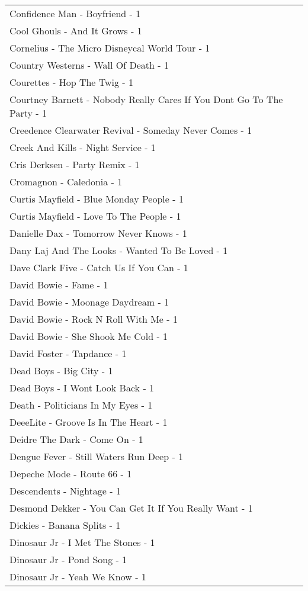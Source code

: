 \documentclass[
]{article}
\begin{document}
\begin{longtable}{l}
Confidence Man - Boyfriend - 1 \\ 
Cool Ghouls - And It Grows - 1 \\ 
Cornelius - The Micro Disneycal World Tour - 1 \\ 
Country Westerns - Wall Of Death - 1 \\ 
Courettes - Hop The Twig - 1 \\ 
Courtney Barnett - Nobody Really Cares If You Dont Go To The Party - 1 \\ 
Creedence Clearwater Revival - Someday Never Comes - 1 \\ 
Creek And Kills - Night Service - 1 \\ 
Cris Derksen - Party Remix - 1 \\ 
Cromagnon - Caledonia - 1 \\ 
Curtis Mayfield - Blue Monday People - 1 \\ 
Curtis Mayfield - Love To The People - 1 \\ 
Danielle Dax - Tomorrow Never Knows - 1 \\ 
Dany Laj And The Looks - Wanted To Be Loved - 1 \\ 
Dave Clark Five - Catch Us If You Can - 1 \\ 
David Bowie - Fame - 1 \\ 
David Bowie - Moonage Daydream - 1 \\ 
David Bowie - Rock N Roll With Me - 1 \\ 
David Bowie - She Shook Me Cold - 1 \\ 
David Foster - Tapdance - 1 \\ 
Dead Boys - Big City - 1 \\ 
Dead Boys - I Wont Look Back - 1 \\ 
Death - Politicians In My Eyes - 1 \\ 
DeeeLite - Groove Is In The Heart - 1 \\ 
Deidre The Dark - Come On - 1 \\ 
Dengue Fever - Still Waters Run Deep - 1 \\ 
Depeche Mode - Route 66 - 1 \\ 
Descendents - Nightage - 1 \\ 
Desmond Dekker - You Can Get It If You Really Want - 1 \\ 
Dickies - Banana Splits - 1 \\ 
Dinosaur Jr - I Met The Stones - 1 \\ 
Dinosaur Jr - Pond Song - 1 \\ 
Dinosaur Jr - Yeah We Know - 1 \\ 

\end{longtable}
\end{document}
